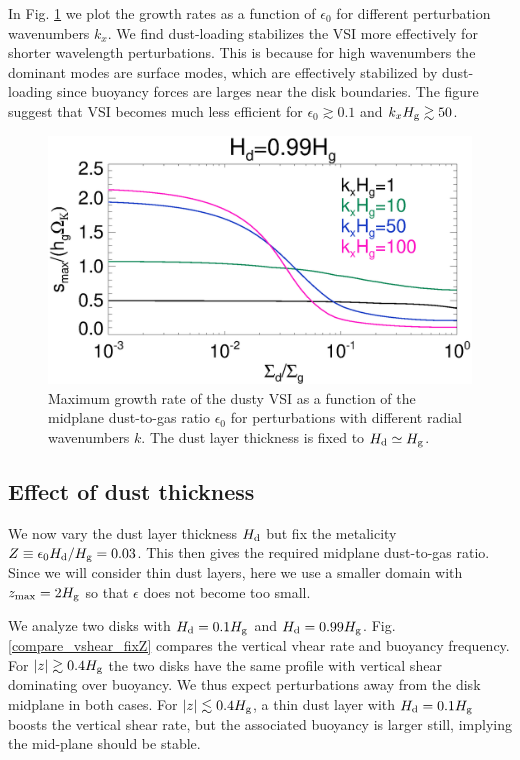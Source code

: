 In Fig. \ref{vsi_dust_loading_vareps} we plot the growth rates as a
function of $\epsilon_0$ for different perturbation wavenumbers
$k_x$. We find dust-loading stabilizes the VSI more effectively for shorter
wavelength perturbations. This is because for high wavenumbers the
dominant modes are surface modes, which are effectively stabilized by
dust-loading since buoyancy forces are larges near the disk
boundaries. The figure suggest that VSI becomes much less efficient
for $\epsilon_0\gtrsim 0.1$ and $k_xH_\mathrm{g}\gtrsim 50$. 

\begin{figure}
  \includegraphics[width=\linewidth]{figures/compare_eigenvals_vareps2} 
  \caption{Maximum growth rate of the dusty VSI as a function of the
    midplane dust-to-gas ratio $\epsilon_0$ for perturbations with
    different radial wavenumbers $k$. The dust layer thickness is
    fixed to $H_\mathrm{d}\simeq H_\mathrm{g}$. 
    \label{vsi_dust_loading_vareps}
    }
\end{figure}




\subsection{Effect of dust thickness} 
We now vary the dust layer thickness $H_\mathrm{d}$ but fix the metalicity 
$Z \equiv \epsilon_0 H_\mathrm{d}/H_\mathrm{g} = 0.03$. This then gives the
required midplane dust-to-gas ratio. Since we will consider thin dust
layers, here we use a smaller 
domain with $z_\mathrm{max}=2H_\mathrm{g}$ so that $\epsilon$ does not become
too small. 

We analyze two disks with $H_\mathrm{d}=0.1H_\mathrm{g}$ and 
$H_\mathrm{d}=0.99H_\mathrm{g}$. Fig. \ref{compare_vshear_fixZ} compares the vertical
vhear rate and buoyancy frequency. For $|z|\gtrsim 0.4H_\mathrm{g}$ the two
disks have the same profile with vertical shear dominating over
buoyancy. We thus expect perturbations away from the disk midplane in 
both cases. For $|z|\lesssim 0.4H_\mathrm{g}$, a thin dust 
layer with $H_\mathrm{d}=0.1H_\mathrm{g}$ boosts the vertical shear rate, but the
associated buoyancy is larger still, implying the mid-plane should be
stable. 

